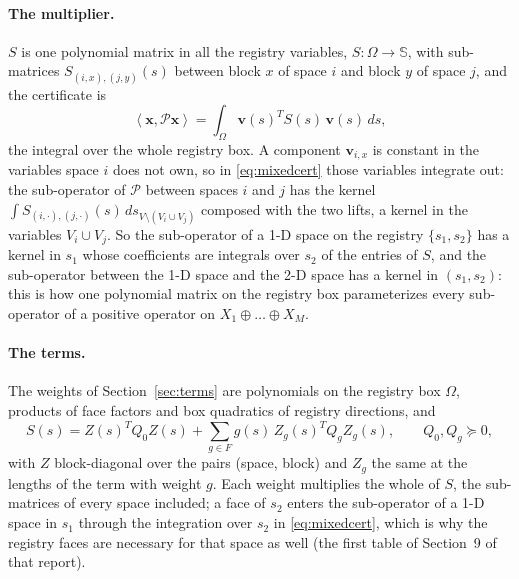\documentclass[12pt]{article}
\newcommand{\Sym}{\mathbb{S}}
\newcommand{\mcl}[1]{\mathcal{#1}}
\newcommand{\mbf}[1]{\mathbf{#1}}
\newcommand{\ip}[2]{\left\langle #1,#2\right\rangle}
\newcommand{\liftref}{the first table of Section~9 of that report}
\theoremstyle{plain}
\theoremstyle{definition}
\theoremstyle{remark}
\begin{document}
\paragraph{The multiplier.} $S$ is one polynomial matrix in all the registry variables, $S:\Omega\to\Sym$, with sub-matrices $S_{(i,x),(j,y)}(s)$ between block $x$ of space $i$ and block $y$ of space $j$, and the certificate is
\begin{equation}\label{eq:mixedcert}
\ip{\mbf x}{\mcl P\mbf x}=\int_\Omega\mbf v(s)^TS(s)\,\mbf v(s)\,ds,
\end{equation}
the integral over the whole registry box. A component $\mbf v_{i,x}$ is constant in the variables space $i$ does not own, so in \eqref{eq:mixedcert} those variables integrate out: the sub-operator of $\mcl P$ between spaces $i$ and $j$ has the kernel $\int S_{(i,\cdot),(j,\cdot)}(s)\,ds_{V\setminus(V_i\cup V_j)}$ composed with the two lifts, a kernel in the variables $V_i\cup V_j$. So the sub-operator of a 1-D space on the registry $\{s_1,s_2\}$ has a kernel in $s_1$ whose coefficients are integrals over $s_2$ of the entries of $S$, and the sub-operator between the 1-D space and the 2-D space has a kernel in $(s_1,s_2)$: this is how one polynomial matrix on the registry box parameterizes every sub-operator of a positive operator on $X_1\oplus\dots\oplus X_M$.

\paragraph{The terms.} The weights of Section~\ref{sec:terms} are polynomials on the registry box $\Omega$, products of face factors and box quadratics of registry directions, and
\begin{equation}\label{eq:mixedS}
S(s)=Z(s)^TQ_0Z(s)+\sum_{g\in F}g(s)\,Z_g(s)^TQ_gZ_g(s),\qquad Q_0,Q_g\succeq0,
\end{equation}
with $Z$ block-diagonal over the pairs (space, block) and $Z_g$ the same at the lengths of the term with weight $g$. Each weight multiplies the whole of $S$, the sub-matrices of every space included; a face of $s_2$ enters the sub-operator of a 1-D space in $s_1$ through the integration over $s_2$ in \eqref{eq:mixedcert}, which is why the registry faces are necessary for that space as well (\liftref).
\end{document}
